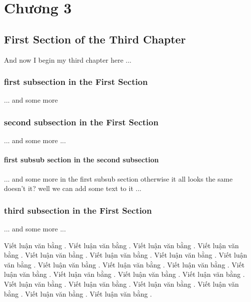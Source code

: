 \chapter{Chương 3}
\ifpdf
    \graphicspath{{Chapter3/Chapter3Figs/PNG/}{Chapter3/Chapter3Figs/PDF/}{Chapter3/Chapter3Figs/}}
\else
    \graphicspath{{Chapter3/Chapter3Figs/EPS/}{Chapter3/Chapter3Figs/}}
\fi

\section{First Section of the Third Chapter}
And now I begin my third chapter here ...

\subsection{first subsection in the First Section}
... and some more 

\subsection{second subsection in the First Section}
... and some more ...

\subsubsection{first subsub section in the second subsection}
... and some more in the first subsub section otherwise it all looks the same
doesn't it? well we can add some text to it ...

\subsection{third subsection in the First Section}
... and some more ...

  Viết luận văn bằng  . Viết luận văn bằng  . Viết luận văn bằng  . Viết luận văn bằng  . Viết luận văn bằng  . Viết luận văn bằng  . Viết luận văn bằng  . Viết luận văn bằng  . Viết luận văn bằng  . Viết luận văn bằng  . Viết luận văn bằng  . Viết luận văn bằng  . Viết luận văn bằng  . Viết luận văn bằng  . Viết luận văn bằng  . Viết luận văn bằng  . Viết luận văn bằng  . Viết luận văn bằng  . Viết luận văn bằng  . Viết luận văn bằng  . Viết luận văn bằng  . 
  
